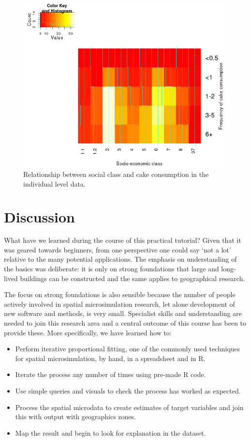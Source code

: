 \documentclass[a4paper, 11pt, twoside]{article}
\begin{document}
\begin{figure}
\centering
 \includegraphics[width=11cm]{hm}
\caption{Relationship between social class and cake consumption in the
individual level data.}
\label{hm}
\end{figure}

\section{Discussion}

What have we learned during the course of this practical tutorial?
Given that it was geared towards beginners, from one perspective
one could say `not a lot' relative to the many potential applications.
The emphasis on understanding of the basics was deliberate: it is only
on strong foundations that large and long-lived buildings can be 
constructed and the same applies to geographical research.

The focus on strong foundations is also sensible because the
number of people actively involved in spatial microsimulation research,
let alone development of new software and methods, is very small.
Specialist skills and understanding are needed to join this research area
and a central outcome of this course has been to provide these.
More specifically, we have learned how to:
\begin{itemize}
 \item Perform iterative proportional fitting, one of the commonly used
techniques for spatial microsimulation, by hand, in a spreadsheet and in R.
 \item Iterate the process any number of times using pre-made R code.
 \item Use simple queries and visuals to check the process has worked as expected.
 \item Process the spatial microdata to create estimates of target variables and
join this with output with geographics zones.
 \item Map the result and begin to look for explanation in the dataset.
\end{itemize}
\end{document}
